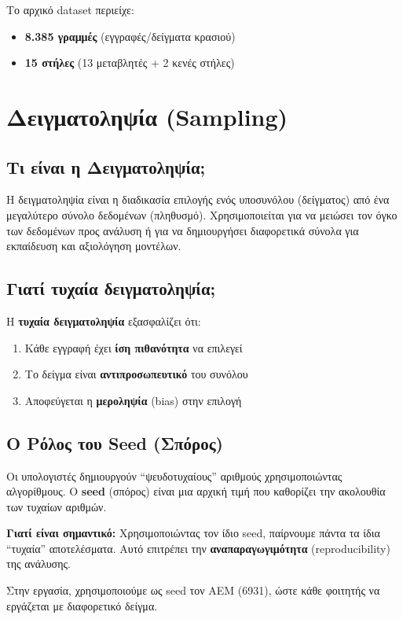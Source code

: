 \documentclass[12pt,a4paper]{article}
\begin{document}
Το αρχικό dataset περιείχε:
\begin{itemize}
    \item \textbf{8.385 γραμμές} (εγγραφές/δείγματα κρασιού)
    \item \textbf{15 στήλες} (13 μεταβλητές + 2 κενές στήλες)
\end{itemize}

\section{Δειγματοληψία (Sampling)}

\subsection{Τι είναι η Δειγματοληψία;}

\begin{infobox}
Η δειγματοληψία είναι η διαδικασία επιλογής ενός υποσυνόλου (δείγματος) από ένα μεγαλύτερο σύνολο δεδομένων (πληθυσμό). Χρησιμοποιείται για να μειώσει τον όγκο των δεδομένων προς ανάλυση ή για να δημιουργήσει διαφορετικά σύνολα για εκπαίδευση και αξιολόγηση μοντέλων.
\end{infobox}

\subsection{Γιατί τυχαία δειγματοληψία;}

Η \textbf{τυχαία δειγματοληψία} εξασφαλίζει ότι:
\begin{enumerate}
    \item Κάθε εγγραφή έχει \textbf{ίση πιθανότητα} να επιλεγεί
    \item Το δείγμα είναι \textbf{αντιπροσωπευτικό} του συνόλου
    \item Αποφεύγεται η \textbf{μεροληψία} (bias) στην επιλογή
\end{enumerate}

\subsection{Ο Ρόλος του Seed (Σπόρος)}

\begin{warningbox}
Οι υπολογιστές δημιουργούν ``ψευδοτυχαίους'' αριθμούς χρησιμοποιώντας αλγορίθμους. Ο \textbf{seed} (σπόρος) είναι μια αρχική τιμή που καθορίζει την ακολουθία των τυχαίων αριθμών.

\textbf{Γιατί είναι σημαντικό:} Χρησιμοποιώντας τον ίδιο seed, παίρνουμε πάντα τα ίδια ``τυχαία'' αποτελέσματα. Αυτό επιτρέπει την \textbf{αναπαραγωγιμότητα} (reproducibility) της ανάλυσης.

Στην εργασία, χρησιμοποιούμε ως seed τον ΑΕΜ (6931), ώστε κάθε φοιτητής να εργάζεται με διαφορετικό δείγμα.
\end{warningbox}
\end{document}
